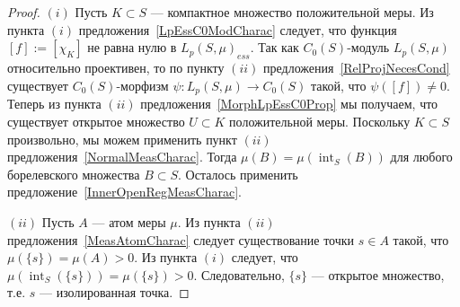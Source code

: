 \documentclass[12pt]{article}
\begin{document}
\begin{proof} $(i)$ Пусть $K\subset S$ --- компактное множество положительной
    меры. Из пункта $(i)$ предложения~\ref{LpEssC0ModCharac} следует, что
    функция $[f]:=[\chi_K]$ не равна нулю в ${L_p(S,\mu)}_{ess}$. Так как
    $C_0(S)$-модуль $L_p(S,\mu)$ относительно проективен, то по пункту $(ii)$
    предложения~\ref{RelProjNecesCond} существует $C_0(S)$-морфизм
    $\psi:L_p(S,\mu)\to C_0(S)$ такой, что $\psi([f])\neq 0$. Теперь из пункта
    $(ii)$ предложения~\ref{MorphLpEssC0Prop} мы получаем, что существует
    открытое множество $U\subset K$ положительной меры. Поскольку $K\subset S$
    произвольно, мы можем применить пункт $(ii)$
    предложения~\ref{NormalMeasCharac}. Тогда
    $\mu(B)=\mu(\operatorname{int}_S(B))$ для любого борелевского множества
    $B\subset S$. Осталось применить предложение~\ref{InnerOpenRegMeasCharac}.

    $(ii)$ Пусть $A$ --- атом меры $\mu$. Из пункта $(ii)$
    предложения~\ref{MeasAtomCharac} следует существование точки $s\in A$ такой,
    что $\mu(\{s\})=\mu(A)>0$. Из пункта $(i)$ следует, что
    $\mu(\operatorname{int}_S(\{s\}))=\mu(\{s\})>0$. Следовательно, $\{s\}$ ---
    открытое множество, т.е. $s$ --- изолированная точка.


\end{proof}
\end{document}
